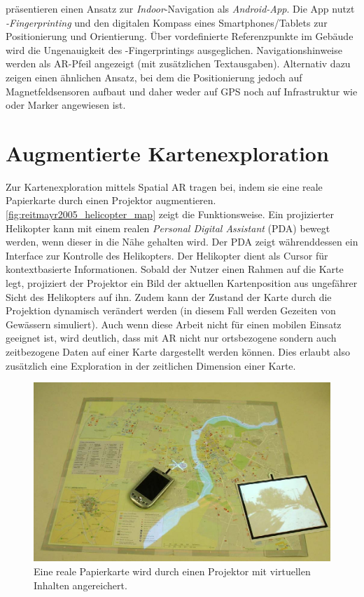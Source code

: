 \textcite{Alnabhan2014} präsentieren einen Ansatz zur \emph{Indoor}-Na\-vi\-ga\-tion als \emph{Android-App}.
Die App nutzt \emph{\wifi-Fingerprinting} und den digitalen Kompass eines Smartphones/Tablets zur Positionierung und Orientierung.
Über vordefinierte Referenzpunkte im Gebäude wird die Ungenauigkeit des \wifi-Fingerprintings ausgeglichen.
Navigationshinweise werden als AR-Pfeil angezeigt (mit zusätzlichen Textausgaben).
Alternativ dazu zeigen \textcite{Liu2016} einen ähnlichen Ansatz, bei dem die Positionierung jedoch auf Magnetfeldsensoren aufbaut und daher weder auf GPS noch auf Infrastruktur wie \wifi oder Marker angewiesen ist.
\clearpage %

\section{Augmentierte Kartenexploration}
Zur Kartenexploration mittels Spatial AR tragen \textcite{Reitmayr2005} bei, indem sie eine reale Papierkarte durch einen Projektor augmentieren.
\autoref{fig:reitmayr2005_helicopter_map} zeigt die Funktionsweise.
Ein projizierter Helikopter kann mit einem realen \emph{Personal Digital Assistant} (PDA) bewegt werden, wenn dieser in die Nähe gehalten wird.
Der PDA zeigt währenddessen ein Interface zur Kontrolle des Helikopters.
Der Helikopter dient als Cursor für kontextbasierte Informationen.
Sobald der Nutzer einen Rahmen auf die Karte legt, projiziert der Projektor ein Bild der aktuellen Kartenposition aus ungefährer Sicht des Helikopters auf ihn.
Zudem kann der Zustand der Karte durch die Projektion dynamisch verändert werden (in diesem Fall werden Gezeiten von Gewässern simuliert).
Auch wenn diese Arbeit nicht für einen mobilen Einsatz geeignet ist, wird deutlich, dass mit AR nicht nur ortsbezogene sondern auch zeitbezogene Daten auf einer Karte dargestellt werden können.
Dies erlaubt also zusätzlich eine Exploration in der zeitlichen Dimension einer Karte.
\begin{figure}
    \includegraphics[width=\textwidth]{figures/reitmayr2005_helicopter_map.png}
    \caption{Eine reale Papierkarte wird durch einen Projektor mit virtuellen Inhalten angereichert. }
    \label{fig:reitmayr2005_helicopter_map}
\end{figure}

